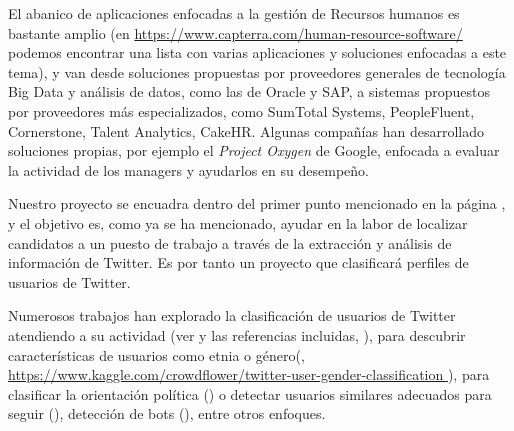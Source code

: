 El abanico de aplicaciones enfocadas a la gestión de Recursos humanos es bastante amplio
(en \url{https://www.capterra.com/human-resource-software/ } podemos encontrar una lista con
varias aplicaciones y soluciones enfocadas a este tema), y van desde soluciones propuestas
por proveedores generales de tecnología Big Data y análisis de datos,
como las de Oracle y SAP, a sistemas propuestos por proveedores más especializados, 
como SumTotal Systems, PeopleFluent, Cornerstone, Talent Analytics, CakeHR.
Algunas compañías han desarrollado soluciones propias,
por ejemplo el {\em Project Oxygen} de Google, enfocada a evaluar la actividad de los managers y 
ayudarlos en su desempeño.

Nuestro proyecto se encuadra dentro del primer punto mencionado en la página 
\pageref{item:puntodeproyecto}, y el objetivo es, como ya se ha mencionado,
ayudar en la labor de localizar candidatos a un puesto de trabajo
a través de la extracción y análisis de información de Twitter.
Es por tanto un proyecto que clasificará perfiles de usuarios de Twitter.


Numerosos  trabajos han explorado la clasificación de usuarios de Twitter
atendiendo a su actividad (ver \cite{tesis_mariluz} y las referencias
incluidas, \cite{user_class5}), para descubrir 
características de usuarios como etnia o género(\cite{user_class1}, \url{https://www.kaggle.com/crowdflower/twitter-user-gender-classification }),
para clasificar la orientación política (\cite{user_class2}) o 
detectar usuarios similares adecuados para seguir (\cite{user_class3}),
detección de bots (\cite{user_class4}), entre otros enfoques.
 

